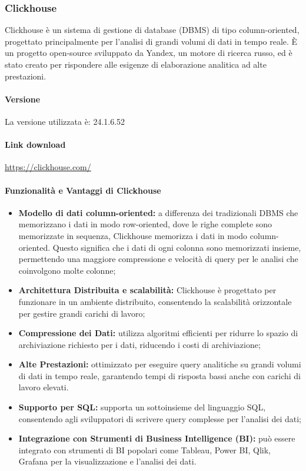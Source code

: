 \subsubsection{Clickhouse} \label{sec:clickhouse}
Clickhouse è un sistema di gestione di database (DBMS) di tipo column-oriented, progettato principalmente per l'analisi di grandi volumi di dati in tempo reale. È un progetto open-source sviluppato da Yandex, un motore di ricerca russo, ed è stato creato per rispondere alle esigenze di elaborazione analitica ad alte prestazioni.
\paragraph{Versione}
La versione utilizzata è: 24.1.6.52
\paragraph{Link download}
\href{https://clickhouse.com/}{https://clickhouse.com/}

\paragraph{Funzionalità e Vantaggi di Clickhouse}
\begin{itemize}
    \item \textbf{ Modello di dati column-oriented:} a differenza dei tradizionali DBMS che memorizzano i dati in modo row-oriented, dove le righe complete sono memorizzate in sequenza, Clickhouse memorizza i dati in modo column-oriented. Questo significa che i dati di ogni colonna sono memorizzati insieme, permettendo una maggiore compressione e velocità di query per le analisi che coinvolgono molte colonne;
    \item \textbf{Architettura Distribuita e scalabilità:} Clickhouse è progettato per funzionare in un ambiente distribuito, consentendo la scalabilità orizzontale per gestire grandi carichi di lavoro;
    \item \textbf{Compressione dei Dati:} utilizza algoritmi efficienti per ridurre lo spazio di archiviazione richiesto per i dati, riducendo i costi di archiviazione;
    \item \textbf{Alte Prestazioni:} ottimizzato per eseguire query analitiche su grandi volumi di dati in tempo reale, garantendo tempi di risposta bassi anche con carichi di lavoro elevati.
    \item \textbf{Supporto per SQL:} supporta un sottoinsieme del linguaggio SQL, consentendo agli sviluppatori di scrivere query complesse per l'analisi dei dati;
    \item \textbf{Integrazione con Strumenti di Business Intelligence (BI):} può essere integrato con strumenti di BI popolari come Tableau, Power BI, Qlik, Grafana per la visualizzazione e l'analisi dei dati.
\end{itemize}


